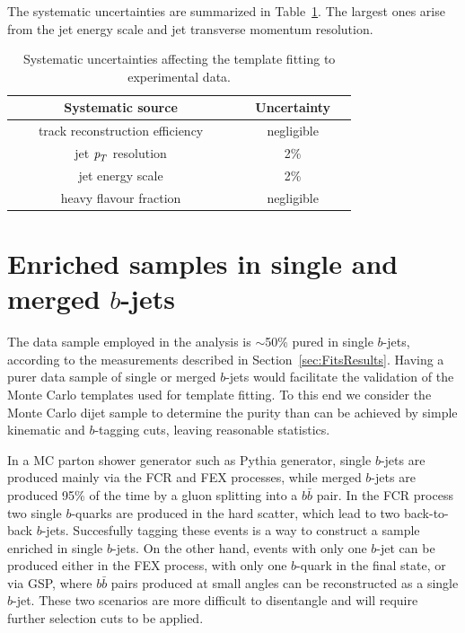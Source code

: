 The systematic uncertainties are summarized in Table~\ref{tb:systematicsfits}. The largest ones arise from the jet energy scale and jet transverse momentum resolution.
\begin{table}[!hbt] %
\renewcommand{\arraystretch}{1.2}
\centering
\begin{tabular}{ | c | c |}
\hline
  ~~~~~~~Systematic source~~~~~~~ &~~Uncertainty~~\\ \hline
  track reconstruction efficiency  &    negligible        \\ 
  jet ${\emph{p}_{T}}$ resolution  &    2\%        \\  
  jet energy scale  &    2\%        \\ 
  heavy flavour fraction  &    negligible        \\ \hline 
\end{tabular}
\caption{Systematic uncertainties affecting the template fitting to experimental data.}
\label{tb:systematicsfits}
\end{table}




\section{Enriched samples in single and merged $b$-jets}\label{sec:Enriched}

The data sample employed in the analysis is $\sim$50\% pured in single $b$-jets, according to the measurements described in Section~\ref{sec:FitsResults}. Having a purer data sample of single or  merged $b$-jets would facilitate the validation of the Monte Carlo templates used for template fitting. To this end we consider the Monte Carlo dijet sample to determine the purity than can be achieved by simple kinematic and $b$-tagging cuts, leaving reasonable statistics.

In a MC parton shower generator such as {\sc Pythia} generator, single $b$-jets are produced mainly via the FCR and FEX processes, while merged $b$-jets are produced 95\% of the time by a gluon splitting into a $b\bar{b}$ pair. In the FCR process two single $b$-quarks are produced in the hard scatter, which lead to two back-to-back $b$-jets. Succesfully tagging these events is a way to construct a sample enriched in single $b$-jets.  On the other hand, events with only one $b$-jet can be produced either in the FEX process, with only one $b$-quark in the final state, or via GSP, where $b\bar{b}$ pairs produced at small angles can be reconstructed as a single $b$-jet. These two scenarios are more difficult to disentangle and will require further selection cuts to be applied.

